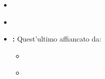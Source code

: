 \begin{itemize}
\item \textbf{}
\item \textbf{}
\item \textbf{:} 
Quest'ultimo affiancato da:
\begin{itemize}
\item \textbf{}
\item \textbf{}
\end{itemize}
\end{itemize}

%
%
%
